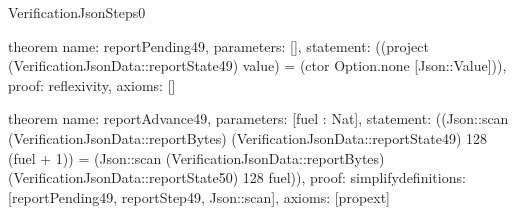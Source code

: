 \begin{lexlean}{VerificationJsonSteps0}
\begin{semanticmodule}
theorem{
  name: reportPending49,
  parameters: [],
  statement: ((project (VerificationJsonData::reportState49) value) = (ctor Option.none [Json::Value])),
  proof: reflexivity{},
  axioms: []
}

theorem{
  name: reportAdvance49,
  parameters: [fuel : Nat],
  statement: ((Json::scan (VerificationJsonData::reportBytes) (VerificationJsonData::reportState49) 128 (fuel + 1)) = (Json::scan (VerificationJsonData::reportBytes) (VerificationJsonData::reportState50) 128 fuel)),
  proof: simplify{definitions: [reportPending49, reportStep49, Json::scan]},
  axioms: [propext]
}

\end{semanticmodule}
\end{lexlean}
